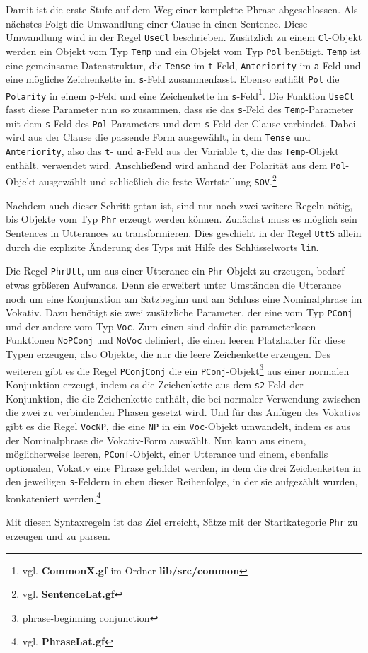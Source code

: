Damit ist die erste Stufe auf dem Weg einer komplette Phrase abgeschlossen. Als nächstes Folgt die Umwandlung einer Clause in einen Sentence. Diese Umwandlung wird in der Regel \texttt{UseCl} beschrieben. Zusätzlich zu einem \texttt{Cl}-Objekt werden ein Objekt vom Typ \texttt{Temp} und ein Objekt vom Typ \texttt{Pol} benötigt. \texttt{Temp} ist eine gemeinsame Datenstruktur, die \texttt{Tense} im \texttt{t}-Feld, \texttt{Anteriority} im \texttt{a}-Feld und eine mögliche Zeichenkette im \texttt{s}-Feld zusammenfasst. Ebenso enthält \texttt{Pol} die \texttt{Polarity} in einem \texttt{p}-Feld und eine Zeichenkette im \texttt{s}-Feld\footnote{vgl. \textbf{CommonX.gf} im Ordner \textbf{lib/src/common}}. Die Funktion \texttt{UseCl} fasst diese Parameter nun so zusammen, dass sie das \texttt{s}-Feld des \texttt{Temp}-Parameter mit dem \texttt{s}-Feld des \texttt{Pol}-Parameters und dem \texttt{s}-Feld der Clause verbindet. Dabei wird aus der Clause die passende Form ausgewählt, in dem \texttt{Tense} und \texttt{Anteriority}, also das \texttt{t}- und \texttt{a}-Feld aus der Variable \texttt{t}, die das \texttt{Temp}-Objekt enthält, verwendet wird. Anschließend wird anhand der Polarität aus dem \texttt{Pol}-Objekt ausgewählt und schließlich die feste Wortstellung \texttt{SOV}.\footnote{vgl. \textbf{SentenceLat.gf}} \par
Nachdem auch dieser Schritt getan ist, sind nur noch zwei weitere Regeln nötig, bis Objekte vom Typ \texttt{Phr} erzeugt werden können. Zunächst muss es möglich sein Sentences in Utterances zu transformieren. Dies geschieht in der Regel \texttt{UttS} allein durch die explizite Änderung des Typs mit Hilfe des Schlüsselworts \texttt{lin}. \par
Die Regel \texttt{PhrUtt}, um aus einer Utterance ein \texttt{Phr}-Objekt zu erzeugen, bedarf etwas größeren Aufwands. Denn sie erweitert unter Umständen die Utterance noch um eine Konjunktion am Satzbeginn und am Schluss eine Nominalphrase im Vokativ. Dazu benötigt sie zwei zusätzliche Parameter, der eine vom Typ \texttt{PConj} und der andere vom Typ \texttt{Voc}. Zum einen sind dafür die parameterlosen Funktionen \texttt{NoPConj} und \texttt{NoVoc} definiert, die einen leeren Platzhalter für diese Typen erzeugen, also Objekte, die nur die leere Zeichenkette erzeugen. Des weiteren gibt es die Regel \texttt{PConjConj} die ein \texttt{PConj}-Objekt\footnote{phrase-beginning conjunction} aus einer normalen Konjunktion erzeugt, indem es die Zeichenkette aus dem \texttt{s2}-Feld der Konjunktion, die die Zeichenkette enthält, die bei normaler Verwendung zwischen die zwei zu verbindenden Phasen gesetzt wird. Und für das Anfügen des Vokativs gibt es die Regel \texttt{VocNP}, die eine \texttt{NP} in ein \texttt{Voc}-Objekt umwandelt, indem es aus der Nominalphrase die Vokativ-Form auswählt. Nun kann aus einem, möglicherweise leeren, \texttt{PConf}-Objekt, einer Utterance und einem, ebenfalls optionalen, Vokativ eine Phrase gebildet werden, in dem die drei Zeichenketten in den jeweiligen \texttt{s}-Feldern in eben dieser Reihenfolge, in der sie aufgezählt wurden, konkateniert werden.\footnote{vgl. \textbf{PhraseLat.gf}} \par
Mit diesen Syntaxregeln ist das Ziel erreicht, Sätze mit der Startkategorie \texttt{Phr} zu erzeugen und zu parsen.
